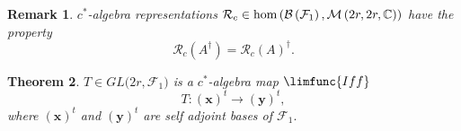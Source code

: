 \documentclass[aps,preprint]{revtex4}
\newtheorem{theorem}{Theorem}
\newtheorem{remark}[theorem]{Remark}
\begin{document}
\begin{remark}
$c^{\ast }$-algebra representations $\mathcal{R}_{c}\in \hom \left( \mathcal{%
B}\left( \mathcal{F}_{1}\right) ,\mathcal{M}\left( 2r,2r,\mathbb{C}\right)
\right) $ have the property 
\begin{equation}
\mathcal{R}_{c}\left( A^{\dagger }\right) =\mathcal{R}_{c}\left( A\right)
^{\dagger }.
\end{equation}
\end{remark}

\begin{theorem}
$T\in GL(2r,\mathcal{F}_{1}\mathbb{)}$ is a $c^{\ast }$-algebra map $%
\limfunc{Iff}$ 
\begin{equation}
T:\left( \boldsymbol{x}\right) ^{t}\rightarrow \left( \boldsymbol{y}\right)
^{t},
\end{equation}%
where $\left( \boldsymbol{x}\right) ^{t}$ and $\left( \boldsymbol{y}\right)
^{t}$ are self adjoint bases of $\mathcal{F}_{1}.$
\end{theorem}
\end{document}
